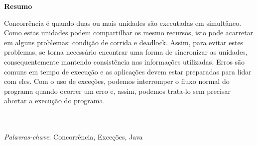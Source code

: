 {
\Large
\begin{center}
\textbf{Resumo}
\end{center}
}

Concorrência é quando duas ou mais unidades são executadas em simultâneo. Como estas unidades
podem compartilhar os mesmo recursos, isto pode acarretar em alguns problemas: condição de
corrida e deadlock. Assim, para evitar estes problemas, se torna necessário encontrar uma forma
de sincronizar as unidades, consequentemente mantendo consistência nas informações utilizadas.
Erros são comuns em tempo de execução e as aplicações devem estar preparadas para lidar com eles.
Com o uso de exceções, podemos interromper o fluxo normal do programa quando ocorrer um erro e, assim,
podemos trata-lo sem precisar abortar a execução do programa.

\quad\\
\quad\\
\textit{Palavras-chave}: Concorrência, Exceções, Java

\pagebreak
